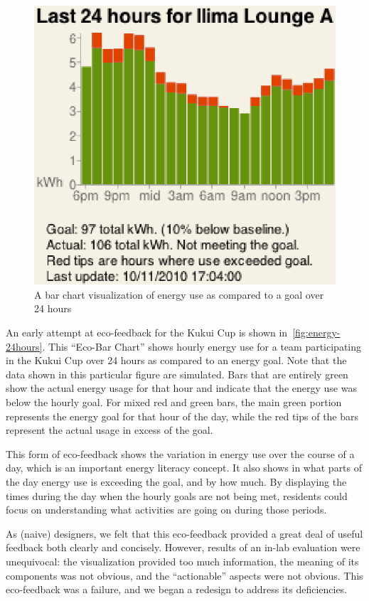 \documentclass{sigchi}
\begin{document}
\begin{figure}[!tb]
	\centering
	\includegraphics[width=0.7\columnwidth]{energy-24hours-new.eps}
	\caption{A bar chart visualization of energy use as compared to a goal over 24 hours}
	\label{fig:energy-24hours}
\end{figure}

An early attempt at eco-feedback for the Kukui Cup is shown in~\autoref{fig:energy-24hours}. This ``Eco-Bar Chart'' shows hourly energy use for a team participating in the Kukui Cup over 24 hours as compared to an energy goal. Note that the data shown in this particular figure are simulated. Bars that are entirely green show the actual energy usage for that hour and indicate that the energy use was below the hourly goal. For mixed red and green bars, the main green portion represents the energy goal for that hour of the day, while the red tips of the bars represent the actual usage in excess of the goal.

This form of eco-feedback shows the variation in energy use over the course of a day, which is an important energy literacy concept. It also shows in what parts of the day energy use is exceeding the goal, and by how much. By displaying the times during the day when the hourly goals are not being met, residents could focus on understanding what activities are going on during those periods.

As (naive) designers, we felt that this eco-feedback provided a great deal of useful feedback both clearly and concisely. However, results of an in-lab evaluation were unequivocal: the visualization provided too much information, the meaning of its components was not obvious, and the ``actionable'' aspects were not obvious. This eco-feedback was a failure, and we began a redesign to address its deficiencies.
\end{document}
